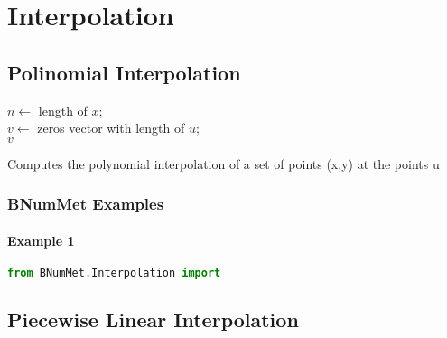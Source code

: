 
\section{Interpolation}
\subsection{Polinomial Interpolation}

\begin{algorithm}[H]
\SetAlgoLined
\DontPrintSemicolon
{}
$n \gets$ length of $x$;\\
$v \gets$ zeros vector with length of $u$;\\
\Return $v$
\caption{Computes the polynomial interpolation of a set of points (x,y) at the points u}
\end{algorithm}
\subsubsection{BNumMet Examples}
\paragraph{Example 1}{
\begin{lstlisting}[language=Python]
from BNumMet.Interpolation import 

\end{lstlisting}
}
\subsection{Piecewise Linear Interpolation}

